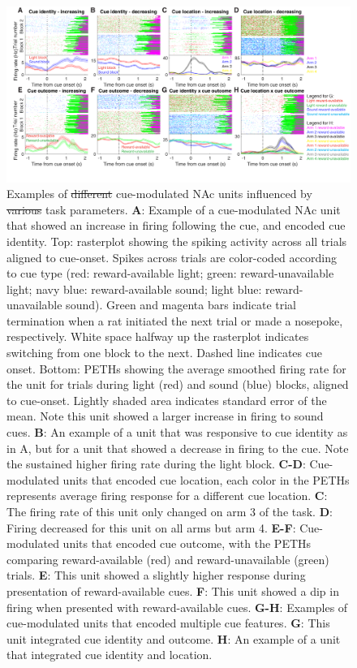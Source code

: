 \documentclass[11pt]{article}
\newcommand{\bsf}[1]{\textbf{#1}}
\providecommand{\DIFadd}[1]{{\protect\color{blue}\uwave{#1}}} %
\providecommand{\DIFdel}[1]{{\protect\color{red}\sout{#1}}}                      %
\providecommand{\DIFaddFL}[1]{\DIFadd{#1}} %
\providecommand{\DIFdelFL}[1]{\DIFdel{#1}} %
\providecommand{\DIFaddbeginFL}{} %
\providecommand{\DIFaddendFL}{} %
\providecommand{\DIFdelbeginFL}{} %
\providecommand{\DIFdelendFL}{} %
\newcommand{\DIFscaledelfig}{0.5}
\newlength{\DIFdelgraphicswidth} %
\newlength{\DIFdelgraphicsheight} %
\newcommand{\DIFaddincludegraphics}[2][]{{\color{blue}\fbox{\DIFOincludegraphics[#1]{#2}}}} %
\newcommand{\DIFdelincludegraphics}[2][]{%
\sbox{\DIFdelgraphicsbox}{\DIFOincludegraphics[#1]{#2}}%
\settoboxwidth{\DIFdelgraphicswidth}{\DIFdelgraphicsbox} %
\settoboxtotalheight{\DIFdelgraphicsheight}{\DIFdelgraphicsbox} %
\scalebox{\DIFscaledelfig}{%
\parbox[b]{\DIFdelgraphicswidth}{\usebox{\DIFdelgraphicsbox}\\[-\baselineskip] \rule{\DIFdelgraphicswidth}{0em}}\llap{\resizebox{\DIFdelgraphicswidth}{\DIFdelgraphicsheight}{%
\setlength{\unitlength}{\DIFdelgraphicswidth}%
\begin{picture}(1,1)%
\thicklines\linethickness{2pt} %
{\color[rgb]{1,0,0}\put(0,0){\framebox(1,1){}}}%
{\color[rgb]{1,0,0}\put(0,0){\line( 1,1){1}}}%
{\color[rgb]{1,0,0}\put(0,1){\line(1,-1){1}}}%
\end{picture}%
}\hspace*{3pt}}} %
} %
\DeclareRobustCommand{\DIFaddbeginFL}{\DIFOaddbeginFL \let\includegraphics\DIFaddincludegraphics} %
\DeclareRobustCommand{\DIFaddendFL}{\DIFOaddendFL \let\includegraphics\DIFOincludegraphics} %
\DeclareRobustCommand{\DIFdelbeginFL}{\DIFOdelbeginFL \let\includegraphics\DIFdelincludegraphics} %
\DeclareRobustCommand{\DIFdelendFL}{\DIFOaddendFL \let\includegraphics\DIFOincludegraphics} %
\begin{document}
 \begin{figure}[ht!]
\centering
\DIFdelbeginFL %
\DIFdelendFL \DIFaddbeginFL \includegraphics[width=\textwidth]{Fig 4 - Neural examples.pdf}
\DIFaddendFL \caption{Examples of \DIFdelbeginFL \DIFdelFL{different }\DIFdelendFL cue-modulated NAc units influenced by \DIFdelbeginFL \DIFdelFL{various
  }\DIFdelendFL \DIFaddbeginFL \DIFaddFL{different
  }\DIFaddendFL task parameters. \bsf{A}: Example of a cue-modulated NAc unit that showed an
  increase in firing following the cue, and encoded cue identity. Top:
  rasterplot showing the spiking activity across all trials aligned to
  cue-onset. Spikes across trials are color-coded according to cue type (red:
  reward-available light; green: reward-unavailable light; navy blue:
  reward-available sound; light blue: reward-unavailable sound). Green and
  magenta bars indicate trial termination when a rat initiated the next trial or
  made a nosepoke, respectively. White space halfway up the rasterplot indicates
  switching from one block to the next. Dashed line indicates cue onset. Bottom:
  PETHs showing the average smoothed firing rate for the unit for trials during
  light (red) and sound (blue) blocks, aligned to cue-onset. Lightly shaded area
  indicates standard error of the mean. Note this unit showed a larger increase
  in firing to sound cues. \bsf{B}: An example of a unit that was responsive to
  cue identity as in A, but for a unit that showed a decrease in firing to the
  cue. Note the sustained higher firing rate during the light block. \bsf{C-D}:
  Cue-modulated units that encoded cue location, each color in the PETHs
  represents average firing response for a different cue location. \bsf{C}: The
  firing rate of this unit only changed on arm 3 of the task. \bsf{D}: Firing
  decreased for this unit on all arms but arm 4. \bsf{E-F}: Cue-modulated units
  that encoded cue outcome, with the PETHs comparing reward-available (red) and
  reward-unavailable (green) trials. \bsf{E}: This unit showed a slightly higher
  response during presentation of reward-available cues. \bsf{F}: This unit
  showed a dip in firing when presented with reward-available cues. \bsf{G-H}:
  Examples of cue-modulated units that encoded multiple cue features. \bsf{G}:
  This unit integrated cue identity and outcome. \bsf{H}: An example of a unit
  that integrated cue identity and location.}
\label{fig:examples}
\end{figure} \clearpage
\end{document}

